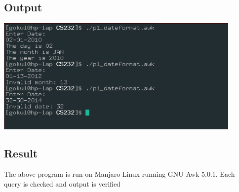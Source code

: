 \documentclass{article}
\begin{document}
\subsection{Output}
\includegraphics[width=0.9\textwidth]{img/p16/ss.png}\newline

\subsection{Result}
The above program is run on Manjaro Linux running GNU Awk 5.0.1. 
Each query is checked and output is verified
\end{document}
